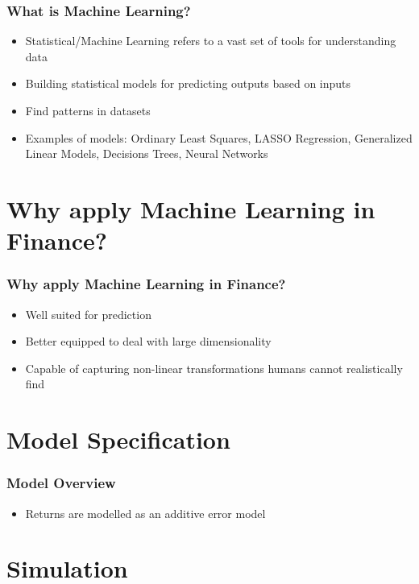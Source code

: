 \documentclass{beamer}
\begin{document}
\begin{frame}
\frametitle{What is Machine Learning?}
\begin{itemize}
	\item Statistical/Machine Learning refers to a vast set of tools for understanding data
	\item Building statistical models for predicting outputs based on inputs
	\item Find patterns in datasets
	\item Examples of models: Ordinary Least Squares, LASSO Regression, Generalized Linear Models, Decisions Trees, Neural Networks
\end{itemize}
\end{frame}

\section{Why apply Machine Learning in Finance?}

\begin{frame}
\frametitle{Why apply Machine Learning in Finance?}
\begin{itemize}
	\item Well suited for prediction
	\item Better equipped to deal with large dimensionality
	\item Capable of capturing non-linear transformations humans cannot realistically find
\end{itemize}
\end{frame}

\section{Model Specification}

\begin{frame}
\frametitle{Model Overview}
\begin{itemize}
	\item Returns are modelled as an additive error model
	
\end{itemize}
\end{frame}

\section{Simulation}
\end{document}
